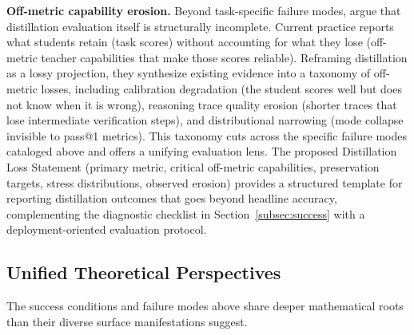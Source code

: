 \documentclass{article} %
\begin{document}
\textbf{Off-metric capability erosion.} Beyond task-specific failure modes, \citet{2604.25110} argue that distillation evaluation itself is structurally incomplete. Current practice reports what students retain (task scores) without accounting for what they lose (off-metric teacher capabilities that make those scores reliable). Reframing distillation as a lossy projection, they synthesize existing evidence into a taxonomy of off-metric losses, including calibration degradation (the student scores well but does not know when it is wrong), reasoning trace quality erosion (shorter traces that lose intermediate verification steps), and distributional narrowing (mode collapse invisible to pass@1 metrics). This taxonomy cuts across the specific failure modes cataloged above and offers a unifying evaluation lens. The proposed Distillation Loss Statement (primary metric, critical off-metric capabilities, preservation targets, stress distributions, observed erosion) provides a structured template for reporting distillation outcomes that goes beyond headline accuracy, complementing the diagnostic checklist in Section~\ref{subsec:success} with a deployment-oriented evaluation protocol.

\subsection{Unified Theoretical Perspectives}
\label{subsec:theory}

The success conditions and failure modes above share deeper mathematical roots than their diverse surface manifestations suggest.
\end{document}
